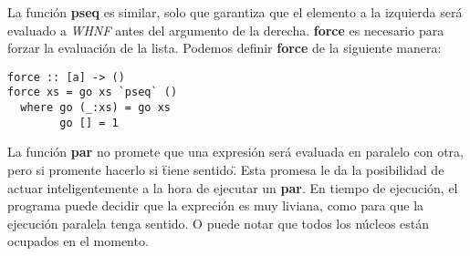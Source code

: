 La función \textbf{pseq} es similar, solo que garantiza que el elemento a la izquierda será evaluado a \textit{WHNF} antes del argumento de la derecha. \textbf{force} es necesario para forzar la evaluación de la lista. Podemos definir \textbf{force} de la siguiente manera:

\begin{lstlisting}
force :: [a] -> ()
force xs = go xs `pseq` ()
  where go (_:xs) = go xs
        go [] = 1
\end{lstlisting}

La función \textbf{par} no promete que una expresión será evaluada en paralelo con otra, pero si promente hacerlo si \"tiene sentido\". Esta promesa le da la posibilidad de actuar inteligentemente a la hora de ejecutar un \textbf{par}. En tiempo de ejecución, el programa puede decidir que la expreción es muy liviana, como para que la ejecución paralela tenga sentido. O puede notar que todos los núcleos están ocupados en el momento.

